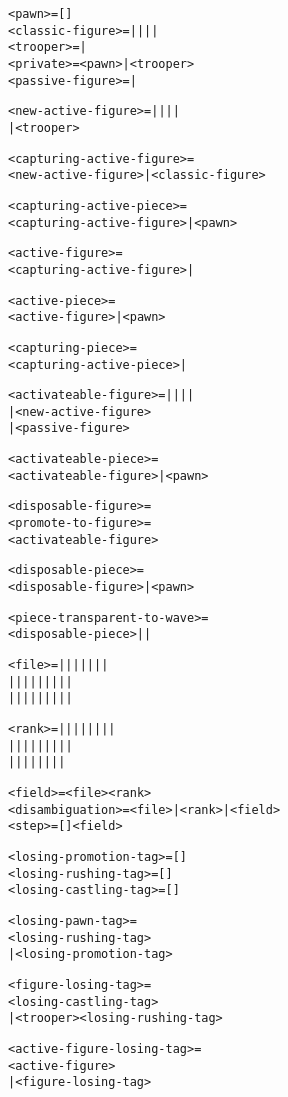 \begin{alltt}
<pawn> = []
<classic-figure> =  |  |  |  | 
<trooper> =  | 
<private> = <pawn> | <trooper>
<passive-figure> =  | 

<new-active-figure> =  |  |  |  | 
                    | <trooper>

<capturing-active-figure> =
  <new-active-figure> | <classic-figure>

<capturing-active-piece> =
  <capturing-active-figure> | <pawn>

<active-figure> =
  <capturing-active-figure> | 

<active-piece> =
  <active-figure> | <pawn>

<capturing-piece> =
  <capturing-active-piece> | 

<activateable-figure> =  |  |  |  | 
                      | <new-active-figure>
                      | <passive-figure>

<activateable-piece> =
  <activateable-figure> | <pawn>

<disposable-figure> =
<promote-to-figure> =
  <activateable-figure>
\end{alltt}

\clearpage %

\begin{alltt}
<disposable-piece> =
  <disposable-figure> | <pawn>

<piece-transparent-to-wave> =
  <disposable-piece> |  | 

<file> =  |  |  |  |  |  |  | 
|  |  |  |  |  |  |  |  | 
|  |  |  |  |  |  |  |  | 

<rank> =  |  |  |  |  |  |  |  | 
|  |  |  |  |  |  |  |  | 
|  |  |  |  |  |  |  | 

<field> = <file><rank>
<disambiguation> = <file> | <rank> | <field>
<step> = []<field>

<losing-promotion-tag> = [\alg{==}]
<losing-rushing-tag> = [\alg{::}]
<losing-castling-tag> = [\alg{\&\&}]

<losing-pawn-tag> =
  <losing-rushing-tag>
| <losing-promotion-tag>

<figure-losing-tag> =
  <losing-castling-tag>
| <trooper><losing-rushing-tag>

<active-figure-losing-tag> =
  <active-figure>
| <figure-losing-tag>
\end{alltt}

